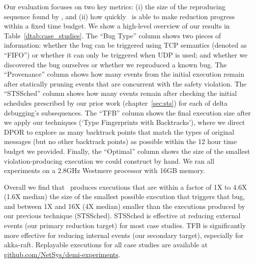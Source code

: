 
Our evaluation focuses on two key metrics: (i) the size of
the reproducing sequence found by \sys, and (ii) how quickly
\sys~is able to make reduction progress within a fixed time
budget. We show a high-level overview
of our results in Table~\ref{dtab:case_studies}.
The ``Bug Type'' column shows two pieces of information: whether the bug can be
triggered using TCP semantics (denoted as ``FIFO'')
or whether it can only be triggered when UDP is used; and whether we discovered
the bug ourselves or whether we
reproduced a known bug. The ``Provenance'' column shows how many events from the initial execution
remain after statically pruning events
that are concurrent with the safety violation.
The ``STSSched'' column shows how many events remain after checking the initial schedules
prescribed by our prior work (chapter~\ref{sec:sts}) for each of delta debugging's
subsequences. The ``TFB'' column shows the final execution size after
we apply our techniques (`Type Fingerprints with Backtracks'), where we direct
DPOR to explore as many backtrack points that match the types of original
messages (but no other
backtrack points) as possible within the 12 hour time budget we provided.
Finally, the ``Optimal'' column shows the size of the smallest
violation-producing execution we could construct by hand.
We ran all experiments on a 2.8GHz Westmere processor with 16GB memory.

Overall we find
that \sys~produces executions that are within
a factor of 1X to 4.6X (1.6X median) the size of the smallest possible execution
that triggers that bug, and between 1X and 16X (4X median) smaller than the
executions produced by our previous technique (STSSched).
STSSched is effective at reducing external events (our primary reduction
target) for most case studies. TFB is
significantly more effective for reducing internal events (our secondary
target), especially for akka-raft.
Replayable executions for all case studies are available at
\href{https://github.com/NetSys/demi-experiments}{github.com/NetSys/demi-experiments}.


